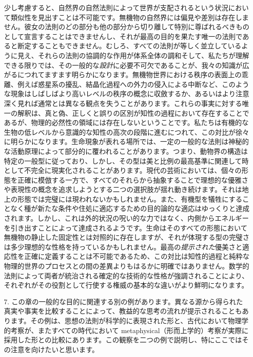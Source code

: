 \documentclass[a4paper,11pt,openany]{ltjsbook}
\begin{document}
少し考慮すると、自然界の自然法則によって世界が支配されるという状況において類似性を見出すことは不可能です。無機物の自然界には偏見や差別は存在しません。彼女の法則のどの部分も他の部分から切り離して特別に尊ばれるべきものとして宣言することはできませんし、それが最高の目的を果たす唯一の法則であると断定することもできません。むしろ、すべての法則が等しく並立しているように見え、それらの法則の協調的な作用が体系全体の調和そして、私たちが理解できる限りでは、その一般的な\emph{設計}に必要不可欠であることが、我々の知識が広がるにつれてますます明らかになります。無機物世界における秩序の表面上の乖離、例えば惑星系の擾乱、結晶化過程への外力の侵入による中断など、このような現象はしばしばより高いレベルの秩序の概念に収斂するか、あるいはより注意深く見れば通常とは異なる観点を失うことがあります。これらの事実に対する唯一の解釈は、真と偽、正しくと誤りの区別が知性の過程において存在することであるが、物理的必然性の領域には存在しないということです。私たちは有機的な生物の低レベルから意識的な知性の高次の段階に進むにつれて、この対比が徐々に明らかになります。生命現象が表れる場所では、一定の一般的な法則は神秘的な活動原理によって部分的に覆われることがあります。つまり、動物界の構造は特定の一般型に従っており、しかし、その型は美と比例の最高基準に関連して時として不完全に現実化されることがあります。現代の芸術においては、個々の形態を正確に模倣する一方で、すべてのそれらから抽象することで理想的な優雅さや表現性の概念を追求しようとする二つの選択肢が揺れ動き続けます。それは地上の形態では完璧には現われないかもしれません。また、有機型を犠牲にすることなく種が新たな条件や住処に適応するための目的論的な適応はゆっくりと達成されます。しかし、これは外的状況の呪い的な力ではなく、内側からエネルギーを引き出すことによって達成されるようです。生命はそのすべての形態において無機物の静止した固定性とは対照的に存在しますが、それが体現する型の完璧さは多少理想的な性格を持っているかもしれません。最高の\emph{提示された}優美さと適応性を正確に定義することは不可能であるため、この対比は知性的過程と純粋な物理的世界のプロセスとの間の差異よりもはるかに明確ではありません。数学的法則によって両者が統治される確定的な技術的な性格が強調されることにより、それぞれがその役割として行使する権威の基本的な違いがより鮮明になります。

7. この章の一般的な目的に関連する別の例があります。異なる源から得られた真実や事実を比較することによって、教益的な思考の流れが提示されることもあります。その例は、思想の法則が科学的に表現された形と、古代において物理学的考察が、またすべての時代において metaphysical（形而上学的）考察が実際に採用した形との比較にあります。この観察を二つの例で説明し、特にここではその注意を向けたいと思います。
\end{document}
